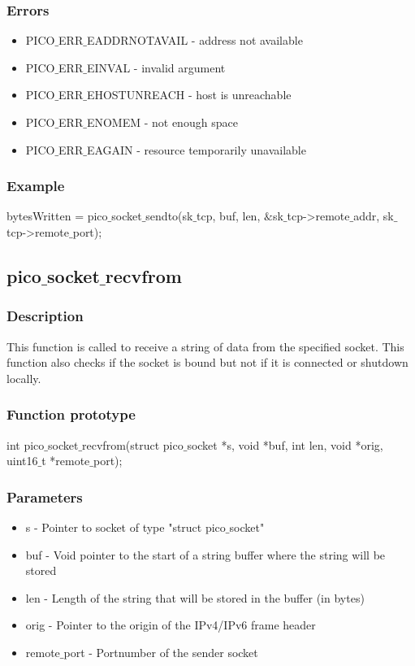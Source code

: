 \subsubsection*{Errors}
\begin{itemize}
\item PICO$\_$ERR$\_$EADDRNOTAVAIL - address not available
\item PICO$\_$ERR$\_$EINVAL - invalid argument
\item PICO$\_$ERR$\_$EHOSTUNREACH - host is unreachable
\item PICO$\_$ERR$\_$ENOMEM - not enough space
\item PICO$\_$ERR$\_$EAGAIN - resource temporarily unavailable
\end{itemize}

\subsubsection*{Example}
bytesWritten = pico$\_$socket$\_$sendto(sk$\_$tcp, buf, len, $\&$sk$\_$tcp->remote$\_$addr, sk$\_$tcp->remote$\_$port);


\subsection{pico$\_$socket$\_$recvfrom}

\subsubsection*{Description}
This function is called to receive a string of data from the specified socket.
This function also checks if the socket is bound but not if it is connected or shutdown locally. 

\subsubsection*{Function prototype}
int pico$\_$socket$\_$recvfrom(struct pico$\_$socket *s, void *buf, int len, void *orig, uint16$\_$t *remote$\_$port);

\subsubsection*{Parameters}
\begin{itemize}
\item s - Pointer to socket of type "struct pico$\_$socket"
\item buf - Void pointer to the start of a string buffer where the string will be stored
\item len - Length of the string that will be stored in the buffer (in bytes)
\item orig - Pointer to the origin of the IPv4/IPv6 frame header
\item remote$\_$port - Portnumber of the sender socket 
\end{itemize}

